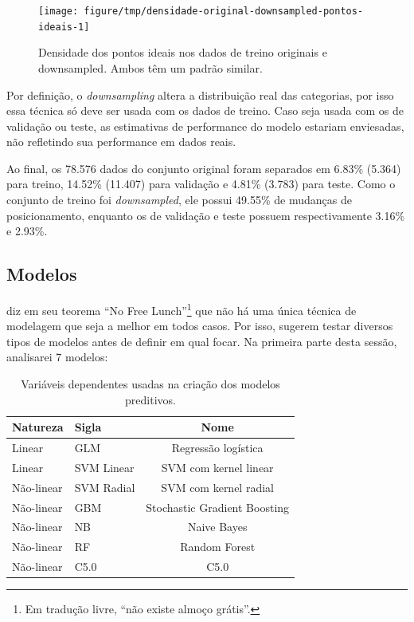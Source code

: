 \documentclass[a4paper,titlepage]{ppgi}\usepackage[]{graphicx}\usepackage[]{color}
\newenvironment{knitrout}{}{} %
\begin{document}
\begin{knitrout}
\color{fgcolor}\begin{figure}
\texttt{[image: figure/tmp/densidade-original-downsampled-pontos-ideais-1]} \caption[Densidade dos pontos ideais nos dados de treino originais e downsampled]{Densidade dos pontos ideais nos dados de treino originais e downsampled. Ambos têm um padrão similar.}\label{fig:densidade-original-downsampled-pontos-ideais}
\end{figure}


\end{knitrout}

Por definição, o \emph{downsampling} altera a distribuição real das categorias,
por isso essa técnica só deve ser usada com os dados de treino.  Caso seja
usada com os de validação ou teste, as estimativas de performance do modelo
estariam enviesadas, não refletindo sua performance em dados reais.

Ao final, os 78.576 dados do conjunto original foram separados em
6.83\%
(5.364) para treino,
14.52\%
(11.407) para validação e 4.81\% (3.783) para teste. Como o conjunto de treino
foi \emph{downsampled}, ele possui
49.55\% de mudanças de
posicionamento, enquanto os de validação e teste possuem respectivamente
3.16\% e
2.93\%.

\subsection{Modelos}

 diz em seu teorema ``No Free Lunch''\footnote{Em
tradução livre, ``não existe almoço grátis''.} que não há uma única técnica de
modelagem que seja a melhor em todos casos. Por isso, 
sugerem testar diversos tipos de modelos antes de definir em qual focar. Na
primeira parte desta sessão, analisarei 7 modelos:

\begin{table}
\centering
\begin{tabular}{l l c}
  Natureza & Sigla & Nome \\
  \hline
  Linear & GLM & Regressão logística \\
  Linear & SVM Linear & SVM com kernel linear \\
  Não-linear & SVM Radial & SVM com kernel radial \\
  Não-linear & GBM & Stochastic Gradient Boosting \\
  Não-linear & NB & Naive Bayes \\
  Não-linear & RF & Random Forest\\
  Não-linear & C5.0 & C5.0 \\
\end{tabular}
\caption{Variáveis dependentes usadas na criação dos modelos preditivos.}
\label{table:tipos-de-modelos}
\end{table}
\end{document}
